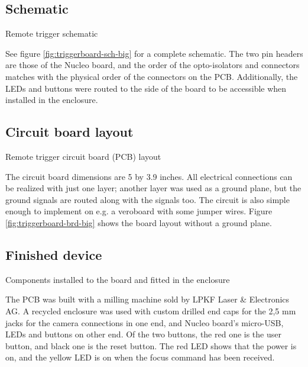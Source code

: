 \subsection{Schematic} \label{app:fullschematic}

{Remote trigger schematic}

See figure \ref{fig:triggerboard-sch-big} for a complete schematic.
The two pin headers are those of the Nucleo board, and the order of the opto-isolators and connectors matches with the physical order of the connectors on the PCB.
Additionally, the LEDs and buttons were routed to the side of the board to be accessible when installed in the enclosure.

\subsection{Circuit board layout}

{Remote trigger circuit board (PCB) layout}

The circuit board dimensions are 5 by 3.9 inches.
All electrical connections can be realized with just one layer;
another layer was used as a ground plane, but the ground signals are routed along with the signals too.
The circuit is also simple enough to implement on e.g. a veroboard with some jumper wires.
Figure \ref{fig:triggerboard-brd-big} shows the board layout without a ground plane.

\subsection{Finished device}

{Components installed to the board and fitted in the enclosure}

The PCB was built with a milling machine sold by LPKF Laser \& Electronics AG.
A recycled enclosure was used with custom drilled end caps for the 2,5 mm jacks for the camera connections in one end, and Nucleo board's micro-USB, LEDs and buttons on other end.
Of the two buttons, the red one is the user button, and black one is the reset button.
The red LED shows that the power is on, and the yellow LED is on when the focus command has been received.

